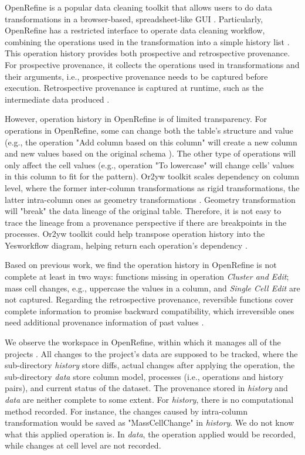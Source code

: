 OpenRefine is a popular data cleaning toolkit that allows users to do data transformations in a browser-based, spreadsheet-like GUI \cite{li2019towards}. Particularly, OpenRefine has a restricted interface to operate data cleaning workflow, combining the operations used in the transformation into a simple history list \cite{delpeuch2019complete}. This operation history provides both prospective and retrospective provenance. For prospective provenance, it collects the operations used in transformations and their arguments, i.e., prospective provenance needs to be captured before execution. Retrospective provenance is captured at runtime, such as the intermediate data produced \cite{murta2014noworkflow}.  

However, operation history in OpenRefine is of limited transparency. For operations in OpenRefine, some can change both the table's structure and value (e.g., the operation "Add column based on this column" will create a new column and new values based on the original schema ). The other type of operations will only affect the cell values (e.g., operation "To lowercase" will change cells' values in this column to fit for the pattern). Or2yw toolkit scales dependency on column level, where the former inter-column transformations as rigid transformations, the latter intra-column ones as geometry transformations \cite{nunez2020first}.
Geometry transformation will "break" the data lineage of the original table. Therefore, it is not easy to trace the lineage from a provenance perspective if there are breakpoints in the processes. Or2yw toolkit could help transpose operation history into the Yesworkflow diagram, helping return each operation's dependency \cite{mcphillips2015yesworkflow}.

Based on previous work, we find the operation history in OpenRefine is not complete at least in two ways: functions missing in operation \textit{Cluster and Edit}; mass cell changes, e.g., uppercase the values in a column, and \textit{Single Cell Edit} are not captured. Regarding the retrospective provenance, reversible functions cover complete information to promise backward compatibility, which irreversible ones need additional provenance information of past values \cite{nunez2020first}.

We observe the workspace in OpenRefine, within which it manages all of the projects \cite{OpenRefine}. All changes to the project's data are supposed to be tracked, where the sub-directory \textit{history} store diffs, actual changes after applying the operation, the sub-directory \textit{data} store column model, processes (i.e., operations and history pairs), and current status of the dataset. The provenance stored in \textit{history} and \textit{data} are neither complete to some extent. For \textit{history}, there is no computational method recorded. For instance, the changes caused by intra-column transformation would be saved as "MassCellChange" in \textit{history}. We do not know what this applied operation is. In \textit{data}, the operation applied would be recorded, while changes at cell level are not recorded. 


